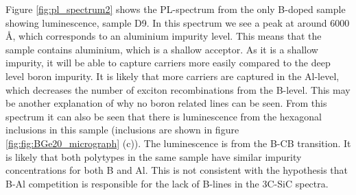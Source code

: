 Figure \ref{fig:pl_spectrum2} shows the PL-spectrum from the only B-doped sample showing luminescence, sample D9. In this spectrum we see a peak at around 6000 Å, which corresponds to an aluminium impurity level. This means that the sample contains aluminium, which is a shallow acceptor. As it is a shallow impurity, it will be able to capture carriers more easily compared to the deep level boron impurity. It is likely that more carriers are captured in the Al-level, which decreases the number of exciton recombinations from the B-level. This may be another explanation of why no boron related lines can be seen. From this spectrum it can also be seen that there is luminescence from the hexagonal inclusions in this sample (inclusions are shown in figure \ref{fig:fig:BGe20_micrograph} (c)). The luminescence is from the B-CB transition. It is likely that both polytypes in the same sample have similar impurity concentrations for both B and Al. This is not consistent with the hypothesis that B-Al competition is responsible for the lack of B-lines in the 3C-SiC spectra. 













































